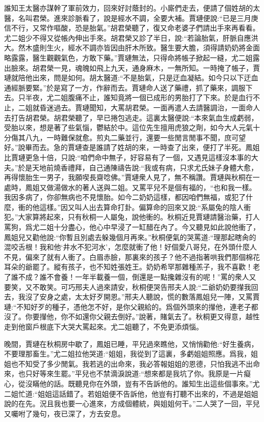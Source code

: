 \begin{parag}
    誰知王太醫亦謀幹了軍前效力，回來好討蔭封的。小廝們走去，便請了個姓胡的太醫，名叫君榮。進來診脈看了，說是經水不調，全要大補。賈璉便說:“已是三月庚信不行，又常作嘔酸，恐是胎氣。”胡君榮聽了，復又命老婆子們請出手來再看看。尤二姐少不得又從帳內伸出手來。胡君榮又診了半日，說:“若論胎氣，肝脈自應洪大。然木盛則生火，經水不調亦皆因由肝木所致。醫生要大膽，須得請奶奶將金面略露露，醫生觀觀氣色，方敢下藥。”賈璉無法，只得命將帳子掀起一縫，尤二姐露出臉來。胡君榮一見，魂魄如飛上九天，通身麻木，一無所知。一時掩了帳子，賈璉就陪他出來，問是如何。胡太醫道:“不是胎氣，只是迂血凝結。如今只以下迂血通經脈要緊。”於是寫了一方，作辭而去。賈璉命人送了藥禮，抓了藥來，調服下去。只半夜，尤二姐腹痛不止，誰知竟將一個已成形的男胎打了下來。於是血行不止，二姐就昏迷過去。賈璉聞知，大罵胡君榮。一面再遣人去請醫調治，一面命人去打告胡君榮。胡君榮聽了，早已捲包逃走。這裏太醫便說:“本來氣血生成虧弱，受胎以來，想是著了些氣惱，鬱結於中。這位先生擅用虎狼之劑，如今大人元氣十分傷其八九，一時難保就愈。煎丸二藥並行，還要一些閒言閒事不聞，庶可望好。”說畢而去。急的賈璉查是誰請了姓胡的來，一時查了出來，便打了半死。鳳姐比賈璉更急十倍，只說:“咱們命中無子，好容易有了一個，又遇見這樣沒本事的大夫。”於是天地前燒香禮拜，自己通陳禱告說:“我或有病，只求尤氏妹子身體大愈，再得懷胎生一男子，我願喫長齋唸佛。”賈璉衆人見了，無不稱讚。賈璉與秋桐在一處時，鳳姐又做湯做水的著人送與二姐。又罵平兒不是個有福的，“也和我一樣。我因多病了，你卻無病也不見懷胎。如今二奶奶這樣，都因咱們無福，或犯了什麼，衝的他這樣。”因又叫人出去算命打卦。偏算命的回來又說:“系屬兔的陰人衝犯。”大家算將起來，只有秋桐一人屬兔，說他衝的。秋桐近見賈璉請醫治藥，打人罵狗，爲尤二姐十分盡心，他心中早浸了一缸醋在內了。今又聽見如此說他衝了，鳳姐兒又勸他說:“你暫且別處去躲幾個月再來。”秋桐便氣的哭罵道:“理那起瞎肏的混咬舌根！我和他‘井水不犯河水’，怎麼就衝了他！好個愛八哥兒，在外頭什麼人不見，偏來了就有人衝了。白眉赤臉，那裏來的孩子？他不過指著哄我們那個棉花耳朵的爺罷了。縱有孩子，也不知姓張姓王。奶奶希罕那雜種羔子，我不喜歡！老了誰不成？誰不會養！一年半載養一個，倒還是一點攙雜沒有的呢！”罵的衆人又要笑，又不敢笑。可巧邢夫人過來請安，秋桐便哭告邢夫人說:“二爺奶奶要攆我回去，我沒了安身之處，太太好歹開恩。”邢夫人聽說，慌的數落鳳姐兒一陣，又罵賈璉:“不知好歹的種子，憑他怎不好，是你父親給的。爲個外頭來的攆他，連老子都沒了。你要攆他，你不如還你父親去倒好。”說著，賭氣去了。秋桐更又得意，越性走到他窗戶根底下大哭大罵起來。尤二姐聽了，不免更添煩惱。
\end{parag}


\begin{parag}
    晚間，賈璉在秋桐房中歇了，鳳姐已睡，平兒過來瞧他，又悄悄勸他:“好生養病，不要理那畜生。”尤二姐拉他哭道:“姐姐，我從到了這裏，多虧姐姐照應。爲我，姐姐也不知受了多少閒氣。我若逃的出命來，我必答報姐姐的恩德，只怕我逃不出命來，也只好等來生罷。”平兒也不禁滴淚說道:“想來都是我坑了你。我原是一片癡心，從沒瞞他的話。既聽見你在外頭，豈有不告訴他的。誰知生出這些個事來。”尤二姐忙道:“姐姐這話錯了。若姐姐便不告訴他，他豈有打聽不出來的，不過是姐姐說的在先。況且我也要一心進來，方成個體統，與姐姐何干。”二人哭了一回，平兒又囑咐了幾句，夜已深了，方去安息。
\end{parag}


